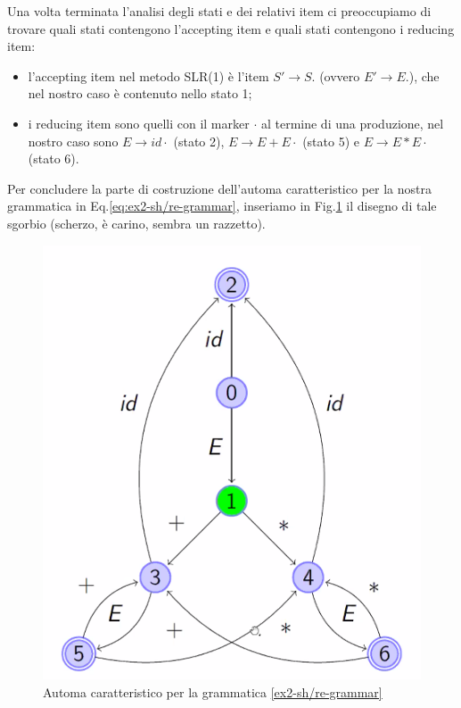 \documentclass[class=book, crop=false, oneside, 12pt]{standalone}
\begin{document}
Una volta terminata l'analisi degli stati e dei relativi item ci preoccupiamo di trovare quali stati contengono l'accepting item e quali stati contengono i reducing item:
\begin{itemize}
    \item l'accepting item nel metodo SLR(1) è l'item \(S' \to S.\) (ovvero \(E' \to E.\)), che nel nostro caso è contenuto nello stato 1;
    \item i reducing item sono quelli con il marker \(\cdot\) al termine di una produzione, nel nostro caso sono \(E \to id \cdot\) (stato 2), \(E \to E+E \cdot\) (stato 5) e \(E \to E*E \cdot\) (stato 6).
\end{itemize}

Per concludere la parte di costruzione dell'automa caratteristico per la nostra grammatica in Eq.\ref{eq:ex2-sh/re-grammar}, inseriamo in Fig.\ref{ex2-sh/re-automata} il disegno di tale sgorbio (scherzo, è carino, sembra un razzetto).
\begin{figure}
    \center
    \includegraphics[width=.6\textwidth]{ex2-sh_re-automata.png}
    \caption{Automa caratteristico per la grammatica \ref{ex2-sh/re-grammar}}
    \label{ex2-sh/re-automata}
\end{figure}
\end{document}
